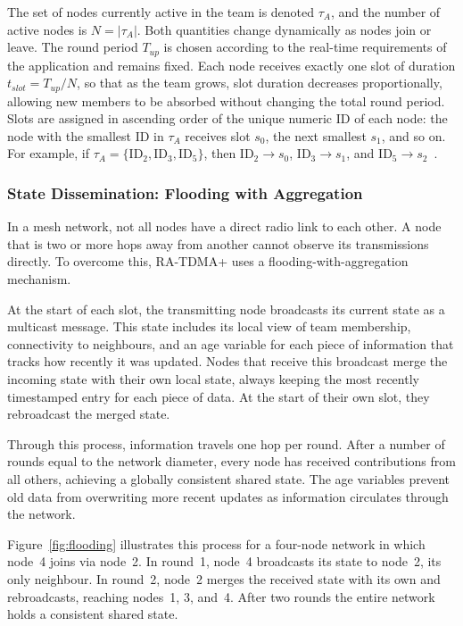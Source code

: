 The set of nodes currently active in the team is denoted $\tau_A$, and
the number of active nodes is $N = |\tau_A|$. Both quantities change
dynamically as nodes join or leave. The round period $T_{up}$ is
chosen according to the real-time requirements of the application and
remains fixed. Each node receives exactly one slot of duration
$t_{slot} = T_{up} / N$, so that as the team grows, slot duration
decreases proportionally, allowing new members to be absorbed without
changing the total round period. Slots are assigned in ascending order
of the unique numeric ID of each node: the node with the smallest ID in
$\tau_A$ receives slot $s_0$, the next smallest $s_1$, and so on. For
example, if $\tau_A = \{\text{ID}_2, \text{ID}_3, \text{ID}_5\}$,
then $\text{ID}_2 \to s_0$, $\text{ID}_3 \to s_1$, and
$\text{ID}_5 \to s_2$~\cite{oliveira2018clockless}.

\subsubsection{State Dissemination: Flooding with Aggregation}

In a mesh network, not all nodes have a direct radio link to each
other. A node that is two or more hops away from another cannot
observe its transmissions directly. To overcome this, RA-TDMA+ uses a
flooding-with-aggregation mechanism.

At the start of each slot, the transmitting node broadcasts its current
state as a multicast message. This state includes its local view of
team membership, connectivity to neighbours, and an age variable for
each piece of information that tracks how recently it was updated.
Nodes that receive this broadcast merge the incoming state with their
own local state, always keeping the most recently timestamped entry for
each piece of data. At the start of their own slot, they rebroadcast
the merged state.

Through this process, information travels one hop per round. After a
number of rounds equal to the network diameter, every node has received
contributions from all others, achieving a globally consistent shared
state. The age variables prevent old data from overwriting more recent
updates as information circulates through the network.

Figure~\ref{fig:flooding} illustrates this process for a four-node
network in which node~4 joins via node~2. In round~1, node~4 broadcasts
its state to node~2, its only neighbour. In round~2, node~2 merges the
received state with its own and rebroadcasts, reaching nodes~1, 3, and~4.
After two rounds the entire network holds a consistent shared state.

